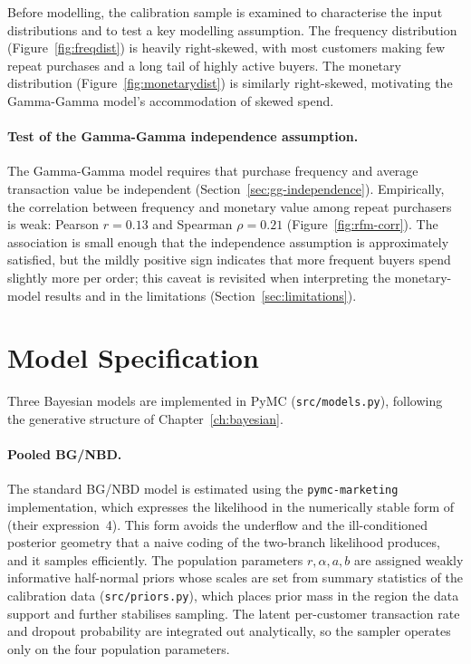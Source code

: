 Before modelling, the calibration sample is examined to characterise the input distributions and to test a key modelling assumption. The frequency distribution (Figure~\ref{fig:freqdist}) is heavily right-skewed, with most customers making few repeat purchases and a long tail of highly active buyers. The monetary distribution (Figure~\ref{fig:monetarydist}) is similarly right-skewed, motivating the Gamma-Gamma model's accommodation of skewed spend.



\paragraph{Test of the Gamma-Gamma independence assumption.}
The Gamma-Gamma model requires that purchase frequency and average transaction value be independent (Section~\ref{sec:gg-independence}). Empirically, the correlation between frequency and monetary value among repeat purchasers is weak: Pearson $r = 0.13$ and Spearman $\rho = 0.21$ (Figure~\ref{fig:rfm-corr}). The association is small enough that the independence assumption is approximately satisfied, but the mildly positive sign indicates that more frequent buyers spend slightly more per order; this caveat is revisited when interpreting the monetary-model results and in the limitations (Section~\ref{sec:limitations}).

\section{Model Specification}
\label{sec:specification}

Three Bayesian models are implemented in PyMC (\texttt{src/models.py}), following the generative structure of Chapter~\ref{ch:bayesian}.

\paragraph{Pooled BG/NBD.}
The standard BG/NBD model \parencite{fader2005} is estimated using the \texttt{pymc-marketing} implementation, which expresses the likelihood in the numerically stable form of \textcite{fader2005} (their expression~4). This form avoids the underflow and the ill-conditioned posterior geometry that a naive coding of the two-branch likelihood produces, and it samples efficiently. The population parameters $r, \alpha, a, b$ are assigned weakly informative half-normal priors whose scales are set from summary statistics of the calibration data (\texttt{src/priors.py}), which places prior mass in the region the data support and further stabilises sampling. The latent per-customer transaction rate and dropout probability are integrated out analytically, so the sampler operates only on the four population parameters.

